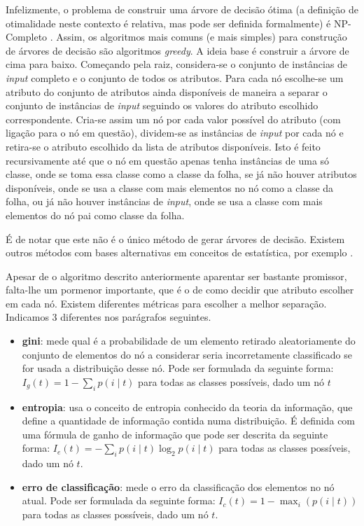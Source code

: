 \documentclass[12pt,a4paper,oneside]{article}
\begin{document}
Infelizmente, o problema de construir uma árvore de decisão ótima (a
definição de otimalidade neste contexto é relativa, mas pode ser
definida formalmente) é NP-Completo \cite{hyafil:1976}. Assim, os
algoritmos mais comuns (e mais simples) para construção de árvores de
decisão são algoritmos \textit{greedy}. A ideia base é construir a
árvore de cima para baixo. Começando pela raiz, considera-se o
conjunto de instâncias de \textit{input} completo e o conjunto de
todos os atributos. Para cada nó escolhe-se um atributo do conjunto de
atributos ainda disponíveis de maneira a separar o conjunto de
instâncias de \textit{input} seguindo os valores do atributo escolhido
correspondente. Cria-se assim um nó por cada valor possível do
atributo (com ligação para o nó em questão), dividem-se as instâncias
de \textit{input} por cada nó e retira-se o atributo escolhido da
lista de atributos disponíveis. Isto é feito recursivamente até que o
nó em questão apenas tenha instâncias de uma só classe, onde se toma
essa classe como a classe da folha, se já não houver atributos
disponíveis, onde se usa a classe com mais elementos no nó como a
classe da folha, ou já não houver instâncias de \textit{input}, onde
se usa a classe com mais elementos do nó pai como classe da folha.

É de notar que este não é o único método de gerar árvores de
decisão. Existem outros métodos com bases alternativas em conceitos de
estatística, por exemplo \cite{chipman:1998}.

Apesar de o algoritmo descrito anteriormente aparentar ser bastante
promissor, falta-lhe um pormenor importante, que é o de como decidir
que atributo escolher em cada nó. Existem diferentes métricas para
escolher a melhor separação. Indicamos 3 diferentes nos parágrafos
seguintes.

\begin{itemize}
\item \textbf{gini}: mede qual é a probabilidade de um elemento
  retirado aleatoriamente do conjunto de elementos do nó a considerar
  seria incorretamente classificado se for usada a distribuição desse
  nó. Pode ser formulada da seguinte forma: $I_g(t) = 1 - \sum_i{p(i
    \mid t)}$ para todas as classes possíveis, dado um nó $t$
\item \textbf{entropia}: usa o conceito de entropia conhecido da
  teoria da informação, que define a quantidade de informação contida
  numa distribuição. É definida com uma fórmula de ganho de informação
  que pode ser descrita da seguinte forma: $I_e(t) = -\sum_i{p(i \mid
    t) \log_2{p(i \mid t)}}$ para todas as classes possíveis, dado um
  nó $t$.
\item \textbf{erro de classificação}: mede o erro da classificação dos
  elementos no nó atual. Pode ser formulada da seguinte forma: $I_c(t)
  = 1 - \max_i{(p(i \mid t))}$ para todas as classes possíveis, dado
  um nó $t$.
\end{itemize}
\end{document}
